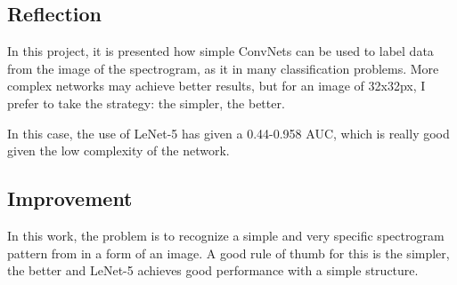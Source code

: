 \documentclass[]{article}
\begin{document}
\subsection{Reflection}\label{reflection}

In this project, it is presented how simple ConvNets can be used to label data from the image of the spectrogram, as it in many classification problems. More complex networks may achieve better results, but for an image of 32x32px, I prefer to take the strategy: the simpler, the better.

In this case, the use of LeNet-5 has given a 0.44-0.958 AUC, which is really good given the low complexity of the network. 
\subsection{Improvement}\label{improvement}


In this work, the problem is to recognize a simple and very specific spectrogram pattern from in a form of an image. A good rule of thumb for this is the simpler, the better and LeNet-5 achieves good performance with a simple structure.  
\end{document}
